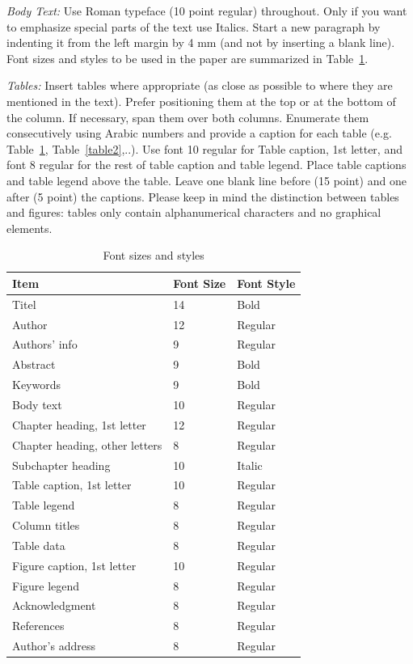 \textit{Body Text:} Use Roman typeface (10 point regular) throughout.
Only if you want to emphasize special parts of the text use Italics.
Start a new paragraph by indenting it from the left margin by 4 mm (and
not by inserting a blank line). Font sizes and styles to be used in the
paper are summarized in Table~\ref{table1}.

\textit{Tables:} Insert tables where appropriate (as close as possible
to where they are mentioned in the text). Prefer positioning them at the
top or at the bottom of the column. If necessary, span them over both
columns. Enumerate them consecutively using Arabic numbers and provide a
caption for each table (e.g. Table~\ref{table1}, Table~\ref{table2},..).
Use font 10 regular for Table caption, 1st letter, and font 8 regular
for the rest of table caption and table legend. Place table captions and
table legend above the table. Leave one blank line before (15 point) and
one after (5 point) the captions. Please keep in mind the distinction
between tables and figures: tables only contain alphanumerical
characters and no graphical elements.

\begin{table}[ht]
  \footnotesize \onehalfspacing
  \caption{Font sizes and styles}
  \begin{tabular}{p{3.90cm}p{1.40cm}p{1.90cm}}
     \hline
     \normalfont Item & Font Size & Font Style \\
     \hline
     Titel & 14 & Bold\\
     Author & 12 & Regular\\
     Authors' info & 9 & Regular\\
     Abstract & 9 & Bold\\
     Keywords & 9 & Bold\\
     Body text & 10 & Regular\\
     Chapter heading, 1st letter & 12 & Regular\\
     Chapter heading, other letters & 8 & Regular\\
     Subchapter heading & 10 & Italic\\
     Table caption, 1st letter & 10 & Regular\\
     Table legend & 8 & Regular\\
     Column titles & 8 & Regular\\
     Table data & 8 & Regular\\
     Figure caption, 1st letter & 10 & Regular\\
     Figure legend & 8 & Regular\\
     Acknowledgment & 8 & Regular\\
     References & 8 & Regular\\
     Author's address & 8 & Regular\\
     \hline
  \end{tabular}
  \label{table1}
\end{table}

